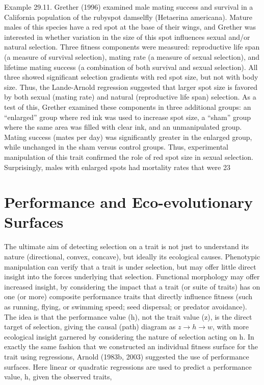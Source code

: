 \documentclass{article}
\begin{document}
Example 29.11. Grether (1996) examined male mating success and survival in a California population of the rubyspot damselfly (Hetaerina americana). Mature males of this species have a red spot at the base of their wings, and Grether was interested in whether variation in the size of this spot influences sexual and/or natural selection. Three fitness components were measured: reproductive life span (a measure of survival selection), mating rate (a measure of sexual selection), and lifetime mating success (a combination of both survival and sexual selection). All three showed significant selection gradients with red spot size, but not with body size. Thus, the Lande-Arnold regression suggested that larger spot size is favored by both sexual (mating rate) and natural (reproductive life span) selection. As a test of this, Grether examined these components in three additional groups: an “enlarged” group where red ink was used to increase spot size, a “sham” group where the same area was filled with clear ink, and an unmanipulated group. Mating success (mates per day) was significantly greater in the enlarged group, while unchanged in the sham versus control groups. Thus, experimental manipulation of this trait confirmed the role of red spot size in sexual selection. Surprisingly, males with enlarged spots had mortality rates that were 23%

\section{Performance and Eco-evolutionary Surfaces}
The ultimate aim of detecting selection on a trait is not just to understand its nature (directional, convex, concave), but ideally its ecological causes. Phenotypic manipulation can verify that a trait is under selection, but may offer little direct insight into the forces underlying that selection. Functional morphology may offer increased insight, by considering the impact that a trait (or suite of traits) has on one (or more) composite performance traits that directly influence fitness (such as running, flying, or swimming speed; seed dispersal; or predator avoidance). The idea is that the performance value (h), not the trait value (z), is the direct target of selection, giving the causal (path) diagram as  $ z \rightarrow h \rightarrow w $, with more ecological insight garnered by considering the nature of selection acting on h. In exactly the same fashion that we constructed an individual fitness surface for the trait using regressions, Arnold (1983b, 2003) suggested the use of performance surfaces. Here linear or quadratic regressions are used to predict a performance value, h, given the observed traits,
\end{document}

